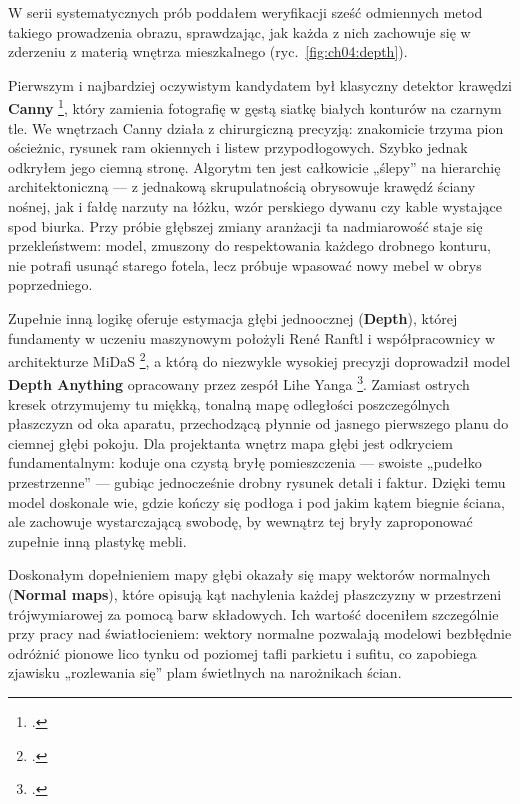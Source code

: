W serii systematycznych prób poddałem weryfikacji sześć odmiennych metod takiego prowadzenia obrazu, sprawdzając, jak każda z nich zachowuje się w zderzeniu z materią wnętrza mieszkalnego (ryc.~\ref{fig:ch04:depth}).

Pierwszym i najbardziej oczywistym kandydatem był klasyczny detektor krawędzi \textbf{Canny} \footcite{canny1986edge}, który zamienia fotografię w gęstą siatkę białych konturów na czarnym tle. We wnętrzach Canny działa z chirurgiczną precyzją: znakomicie trzyma pion ościeżnic, rysunek ram okiennych i listew przypodłogowych. Szybko jednak odkryłem jego ciemną stronę. Algorytm ten jest całkowicie „ślepy” na hierarchię architektoniczną --- z jednakową skrupulatnością obrysowuje krawędź ściany nośnej, jak i fałdę narzuty na łóżku, wzór perskiego dywanu czy kable wystające spod biurka. Przy próbie głębszej zmiany aranżacji ta nadmiarowość staje się przekleństwem: model, zmuszony do respektowania każdego drobnego konturu, nie potrafi usunąć starego fotela, lecz próbuje wpasować nowy mebel w obrys poprzedniego.

Zupełnie inną logikę oferuje estymacja głębi jednoocznej (\textbf{Depth}), której fundamenty w uczeniu maszynowym położyli René Ranftl i współpracownicy w architekturze MiDaS \textcolor{orange}{\footcite{ranftl2020midas}}, a którą do niezwykle wysokiej precyzji doprowadził model \textbf{Depth Anything} opracowany przez zespół Lihe Yanga \textcolor{orange}{\footcite{yang2024depthanything}}. Zamiast ostrych kresek otrzymujemy tu miękką, tonalną mapę odległości poszczególnych płaszczyzn od oka aparatu, przechodzącą płynnie od jasnego pierwszego planu do ciemnej głębi pokoju. Dla projektanta wnętrz mapa głębi jest odkryciem fundamentalnym: koduje ona czystą bryłę pomieszczenia --- swoiste „pudełko przestrzenne” --- gubiąc jednocześnie drobny rysunek detali i faktur. Dzięki temu model doskonale wie, gdzie kończy się podłoga i pod jakim kątem biegnie ściana, ale zachowuje wystarczającą swobodę, by wewnątrz tej bryły zaproponować zupełnie inną plastykę mebli.

Doskonałym dopełnieniem mapy głębi okazały się mapy wektorów normalnych (\textbf{Normal maps}), które opisują kąt nachylenia każdej płaszczyzny w przestrzeni trójwymiarowej za pomocą barw składowych. Ich wartość doceniłem szczególnie przy pracy nad światłocieniem: wektory normalne pozwalają modelowi bezbłędnie odróżnić pionowe lico tynku od poziomej tafli parkietu i sufitu, co zapobiega zjawisku „rozlewania się” plam świetlnych na narożnikach ścian.

